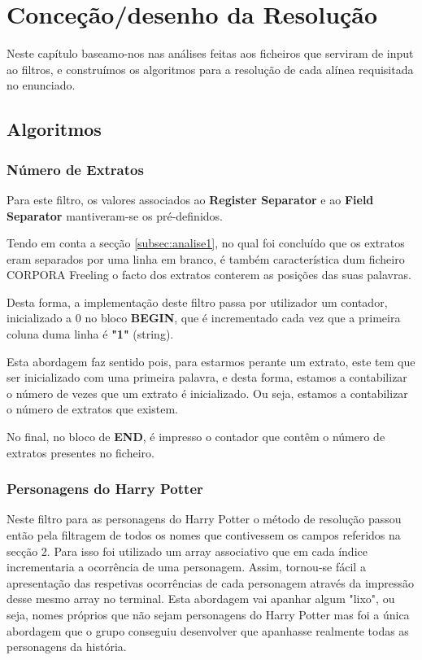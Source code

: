 \documentclass[11pt,a4paper]{report}
\begin{document}
\chapter{Conceção/desenho da Resolução}
\label{chap:concecao}

Neste capítulo baseamo-nos nas análises feitas aos ficheiros que serviram de input ao filtros, e construímos os algoritmos para a resolução de cada alínea requisitada no enunciado.

\section{Algoritmos}
\subsection{Número de Extratos}
\label{subsec:algoritmos1}

Para este filtro, os valores associados ao \textbf{Register Separator} e ao \textbf{Field Separator} mantiveram-se os pré-definidos.

Tendo em conta a secção \ref{subsec:analise1}, no qual foi concluído que os extratos eram separados por uma linha em branco, é também característica dum ficheiro CORPORA Freeling o facto dos extratos conterem as posições das suas palavras.

Desta forma, a implementação deste filtro passa por utilizador um contador, inicializado a 0 no bloco \textbf{BEGIN}, que é incrementado cada vez que a primeira coluna duma linha é \textbf{"1"} (string).

Esta abordagem faz sentido pois, para estarmos perante um extrato, este tem que ser inicializado com uma primeira palavra, e desta forma, estamos a contabilizar o número de vezes que um extrato é inicializado. Ou seja, estamos a contabilizar o número de extratos que existem.

No final, no bloco de \textbf{END}, é impresso o contador que contêm o número de extratos presentes no ficheiro.


\subsection{Personagens do Harry Potter}
\label{sub:algoritmos2}

Neste filtro para as personagens do Harry Potter o método de resolução passou então pela filtragem de todos os nomes que contivessem os campos referidos na secção 2. Para isso foi utilizado um array associativo que em cada índice incrementaria a ocorrência de uma personagem. Assim, tornou-se fácil a apresentação das respetivas ocorrências de cada personagem através da impressão desse mesmo array no terminal.
Esta abordagem vai apanhar algum "lixo", ou seja, nomes próprios que não sejam personagens do Harry Potter mas foi a única abordagem que o grupo conseguiu desenvolver que apanhasse realmente todas as personagens da história.
\end{document}
